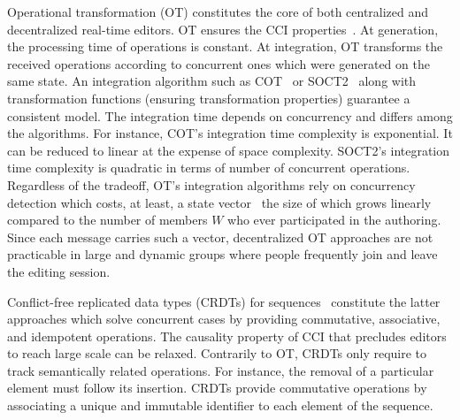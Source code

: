 Operational transformation (OT) constitutes the core of both centralized and
decentralized real-time editors. OT ensures the CCI
properties~\cite{sun1998achieving}. At generation, the processing time of
operations is constant. At integration, OT transforms the received operations
according to concurrent ones which were generated on the same state. An
integration algorithm such as COT~\cite{sun2009contextbased} or
SOCT2~\cite{vidot2000copies} along with transformation functions (ensuring
transformation properties) guarantee a consistent model. The integration time
depends on concurrency and differs among the algorithms.  For instance, COT's
integration time complexity is exponential. It can be reduced to linear at the
expense of space complexity. SOCT2's integration time complexity is quadratic in
terms of number of concurrent operations.  Regardless of the tradeoff, OT's
integration algorithms rely on concurrency detection which costs, at least, a
state vector~\cite{charronbost1991concerning} the size of which grows linearly
compared to the number of members $W$ who ever participated in the
authoring. Since each message carries such a vector, decentralized OT approaches
are not practicable in large and dynamic groups where people frequently join and
leave the editing session.

Conflict-free replicated data types (CRDTs) for
sequences~\cite{shapiro2011comprehensive, shapiro2011conflict} constitute the
latter approaches which solve concurrent cases by providing commutative,
associative, and idempotent operations. The causality property of CCI that
precludes editors to reach large scale can be relaxed. Contrarily to OT, CRDTs
only require to track semantically related operations. For instance, the removal
of a particular element must follow its insertion. 
CRDTs provide commutative operations by associating a unique and immutable
identifier to each element of the sequence.

